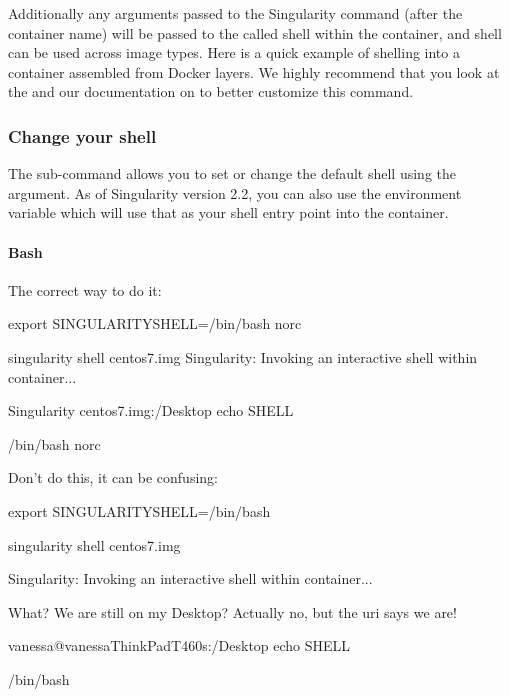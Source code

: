\documentclass[letterpaper,10pt,english]{sphinxmanual}
\begin{document}
Additionally any arguments passed to the Singularity command (after the
container name) will be passed to the called shell within the container,
and shell can be used across image types. Here is a quick example of
shelling into a container assembled from Docker layers. We highly
recommend that you look at the  and our documentation on  to
better customize this command.


\subsubsection{Change your shell}
\label{\detokenize{appendix:change-your-shell}}
The  sub-command allows you to set or change the default shell using the 
argument. As of Singularity version 2.2, you can also use the
environment variable  which will use that as your shell entry point into
the container.


\paragraph{Bash}
\label{\detokenize{appendix:bash}}
The correct way to do it:

%
\begin{sphinxVerbatim}[commandchars=\\\{\}]
export SINGULARITY\PYGZus{}SHELL=\PYGZdq{}/bin/bash \PYGZhy{}\PYGZhy{}norc\PYGZdq{}

singularity shell centos7.img Singularity: Invoking an interactive shell within container...

Singularity centos7.img:\PYGZti{}/Desktop\PYGZgt{} echo \PYGZdl{}SHELL

/bin/bash \PYGZhy{}\PYGZhy{}norc
\end{sphinxVerbatim}

Don’t do this, it can be confusing:

%
\begin{sphinxVerbatim}[commandchars=\\\{\}]
\PYGZdl{} export SINGULARITY\PYGZus{}SHELL=/bin/bash

\PYGZdl{} singularity shell centos7.img

Singularity: Invoking an interactive shell within container...


\PYGZsh{} What? We are still on my Desktop? Actually no, but the uri says we are!

vanessa@vanessa\PYGZhy{}ThinkPad\PYGZhy{}T460s:\PYGZti{}/Desktop\PYGZdl{} echo \PYGZdl{}SHELL

/bin/bash
\end{sphinxVerbatim}
\end{document}
